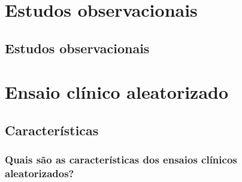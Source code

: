 \documentclass[
  a4paper,
]{book}
\begin{document}
\hypertarget{estudos-observacionais}{%
\chapter{\texorpdfstring{\textbf{Estudos observacionais}}{Estudos observacionais}}\label{estudos-observacionais}}

\hypertarget{observacionais}{%
\section{Estudos observacionais}\label{observacionais}}

\hypertarget{ensaio-cluxednico-aleatorizado}{%
\chapter{\texorpdfstring{\textbf{Ensaio clínico aleatorizado}}{Ensaio clínico aleatorizado}}\label{ensaio-cluxednico-aleatorizado}}

\hypertarget{caracteristicas}{%
\section{Características}\label{caracteristicas}}

\hypertarget{quais-suxe3o-as-caracteruxedsticas-dos-ensaios-cluxednicos-aleatorizados}{%
\subsection{Quais são as características dos ensaios clínicos aleatorizados?}\label{quais-suxe3o-as-caracteruxedsticas-dos-ensaios-cluxednicos-aleatorizados}}
\end{document}
